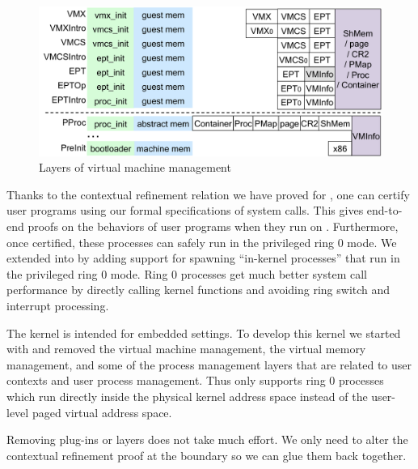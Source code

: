 {\begin{figure}
\includegraphics[scale=0.33]{figs/intel_layer}	
\caption{Layers of virtual machine management}
\label{fig:base:vm:layers}
\end{figure}

Thanks to the contextual refinement relation we have proved for
\mCTOSbase{}, one can certify user programs using our formal
specifications of system calls. This gives end-to-end proofs on
the behaviors of user programs when they run on \mCTOSbase{}.  
Furthermore, once certified, these processes can safely run in
the privileged ring 0 mode.  We extended \mCTOSbase{} into
\mCTOSringz{} by adding support for spawning ``in-kernel
processes'' that run in the privileged ring 0 mode. 
Ring 0 processes get much
better system call performance by directly calling kernel
functions and avoiding ring switch and interrupt processing. 

The \mCTOSembed{} kernel is intended for embedded settings. To develop
this kernel we started with \mCTOSringz{} and removed the virtual
machine management, the virtual memory management, and some of the
process management layers that are related to user contexts and user
process management.  Thus \mCTOSembed{} only supports ring 0 processes
which run directly inside the physical kernel address space instead of
the user-level paged virtual address space.

Removing plug-ins or layers does not take much effort.
We only need to alter the contextual refinement proof 
at the boundary so we can glue them back together.

}
